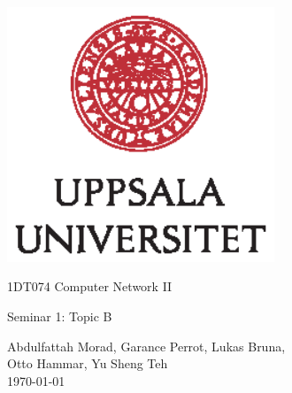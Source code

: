 \documentclass{article}
\begin{document}
\begin{titlepage}
  \begin{center}
    \includegraphics[width=0.6\textwidth]{figures/UU_logo.eps}
  \end{center}
  \vspace{3em}
  \begin{center}
    \Large 1DT074 Computer Network II
  \end{center}
  \vspace{5em}
  \begin{center}
    \Large Seminar 1: Topic B  
  \end{center}
  \vspace{10em}
  \begin{center}
    Abdulfattah Morad,  Garance Perrot, Lukas Bruna,\\
    Otto Hammar, Yu Sheng Teh\\
    \today
  \end{center}
\end{titlepage}









\end{document}
